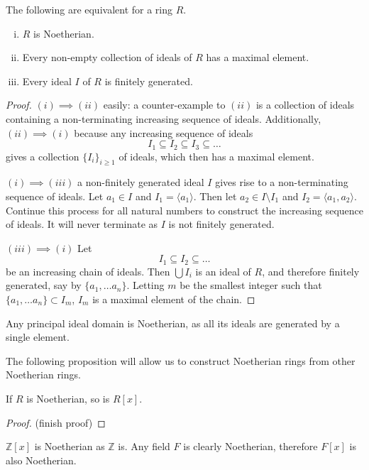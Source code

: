 \begin{proposition}\label{noetherian-module-equivalences}
The following are equivalent for a ring $R$.
\begin{enumerate}[(i)]
    \item $R$ is Noetherian.
    \item Every non-empty collection of ideals of $R$ has a maximal element.
    \item Every ideal $I$ of $R$ is finitely generated.
\end{enumerate}
\end{proposition}
\begin{proof}
$(i)\implies (ii)$ easily: a counter-example to $(ii)$ is a collection of ideals containing a non-terminating increasing sequence of ideals. Additionally, $(ii)\implies (i)$ because any increasing sequence of ideals
$$I_1\subseteq I_2\subseteq I_3 \subseteq \dots$$
gives a collection $\{I_i\}_{i\geq 1}$ of ideals, which then has a maximal element.

$(i)\implies (iii)$ a non-finitely generated ideal $I$ gives rise to a non-terminating sequence of ideals. Let $a_1\in I$ and $I_1=\langle a_1\rangle$. Then let $a_2\in I\setminus I_1$ and $I_2=\langle a_1,a_2\rangle$. Continue this process for all natural numbers to construct the increasing sequence of ideals. It will never terminate as $I$ is not finitely generated.

$(iii)\implies (i)$ Let $$I_1\subseteq I_2\subseteq \dots$$ be an increasing chain of ideals. Then $\bigcup I_i$ is an ideal of $R$, and therefore finitely generated, say by $\{a_1,\dots a_n\}$. Letting $m$ be the smallest integer such that $\{a_1,\dots a_n\}\subset I_m$, $I_m$ is a maximal element of the chain.

\end{proof}

\begin{example}
Any principal ideal domain is Noetherian, as all its ideals are generated by a single element.
\end{example}
The following proposition will allow us to construct Noetherian rings from other Noetherian rings.
\begin{proposition}
If $R$ is Noetherian, so is $R[x]$.
\end{proposition}
\begin{proof}
(finish proof)
\end{proof}

\begin{example}
$\mathbb{Z}[x]$ is Noetherian as $\mathbb{Z}$ is. Any field $F$ is clearly Noetherian, therefore $F[x]$ is also Noetherian.
\end{example}


